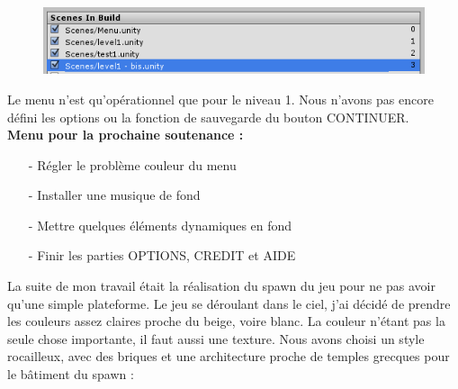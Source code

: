 \documentclass[a4paper]{article}
\begin{document}
\begin{figure}[h]
\begin{center}
\includegraphics[width=1\textwidth]{build.png}
\end{center}
\end{figure}

Le menu n’est qu’opérationnel que pour le niveau 1. Nous n’avons pas encore défini les options ou la fonction de sauvegarde du bouton CONTINUER.\\



\textbf{ Menu pour la prochaine soutenance : }
\begin{itemize}
\item[-]Régler le problème couleur du menu 
\item[-]Installer une musique de fond
\item[-]Mettre quelques éléments dynamiques en fond
\item[-]Finir les parties OPTIONS, CREDIT et AIDE
\end{itemize}

\pagebreak
La suite de mon travail était la réalisation du spawn du jeu pour ne pas avoir qu’une simple plateforme. Le jeu se déroulant dans le ciel, j’ai décidé de prendre les couleurs assez claires proche du beige, voire blanc. La couleur n’étant pas la seule chose importante, il faut aussi une texture. Nous avons choisi un style rocailleux, avec des briques et une architecture proche de temples grecques pour le bâtiment du spawn :  
\end{document}
